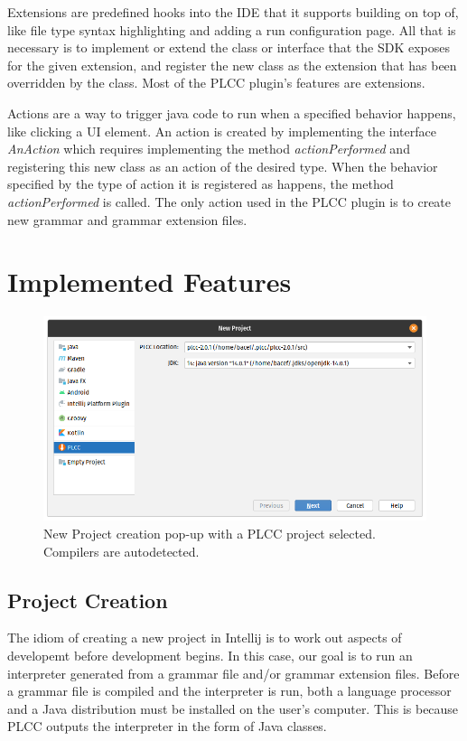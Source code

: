 \documentclass[conference, letterpaper]{IEEEtran}
\begin{document}
Extensions are predefined hooks into the IDE that it supports building on top of, like file type syntax highlighting and adding a run configuration page.
All that is necessary is to implement or extend the class or interface that the SDK exposes for the given extension, and register the new class as the extension that has been overridden by the class.
Most of the PLCC plugin's features are extensions.

Actions are a way to trigger java code to run when a specified behavior happens, like clicking a UI element.
An action is created by implementing the interface \textit{AnAction} which requires implementing the method \textit{actionPerformed} and registering this new class as an action of the desired type.
When the behavior specified by the type of action it is registered as happens, the method \textit{actionPerformed} is called.
The only action used in the PLCC plugin is to create new grammar and grammar extension files.


\section{Implemented Features}\label{sec:implemented-features}
\begin{figure}[!t]
    \centering
    \includegraphics[width=6in]{proj_config.png}
    \caption{New Project creation pop-up with a PLCC project selected. Compilers are autodetected.}
    \label{fig:proj_config}
\end{figure}

\subsection{Project Creation}\label{subsec:project-creation}
The idiom of creating a new project in Intellij is to work out aspects of developemt before development begins.
In this case, our goal is to run an interpreter generated from a grammar file and/or grammar extension files.
Before a grammar file is compiled and the interpreter is run, both a language processor and a Java distribution must be installed on the user's computer.
This is because PLCC outputs the interpreter in the form of Java classes.
\end{document}
